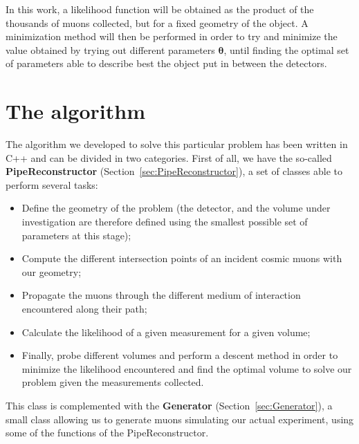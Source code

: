 \documentclass[a4paper, 11pt]{report}
\begin{document}
In this work, a likelihood function will be obtained as the product of the thousands of muons collected, but for a fixed geometry of the object. A minimization method will then be performed in order to try and minimize the value obtained by trying out different parameters $\bm \theta$, until finding the optimal set of parameters able to describe best the object put in between the detectors.






























\chapter{The algorithm} \label{chapter:algorithm}

The algorithm we developed to solve this particular problem has been written in C++ and can be divided in two categories. First of all, we have the so-called \textbf{PipeReconstructor} (Section~\ref{sec:PipeReconstructor}), a set of classes able to perform several tasks:
\begin{itemize}
\item Define the geometry of the problem (the detector, and the volume under investigation are therefore defined using the smallest possible set of parameters at this stage);
\item Compute the different intersection points of an incident cosmic muons with our geometry;
\item Propagate the muons through the different medium of interaction encountered along their path;
\item Calculate the likelihood of a given measurement for a given volume;
\item Finally, probe different volumes and perform a descent method in order to minimize the likelihood encountered and find the optimal volume to solve our problem given the measurements collected. 
\end{itemize}
This class is complemented with the \textbf{Generator} (Section~\ref{sec:Generator}), a small class allowing us to generate muons simulating our actual experiment, using some of the functions of the PipeReconstructor.
\end{document}
